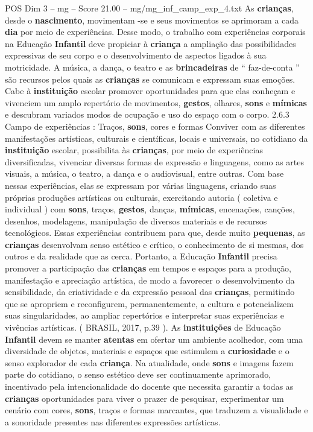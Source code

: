 \begin{textsample}{POS Dim 3 – mg – Score 21.00 – mg/mg\_inf\_camp\_exp\_4.txt}
As \textbf{crianças}, desde o \textbf{nascimento}, movimentam -se e seus movimentos se aprimoram a cada \textbf{dia} por meio de experiências.
Desse modo, o trabalho com experiências corporais na Educação \textbf{Infantil} deve propiciar à \textbf{criança} a ampliação das possibilidades expressivas de seu corpo e o desenvolvimento de aspectos ligados à sua motricidade.
A música, a dança, o teatro e as \textbf{brincadeiras} de “ faz-de-conta ” são recursos pelos quais as \textbf{crianças} se comunicam e expressam suas emoções.
Cabe à \textbf{instituição} escolar promover oportunidades para que elas conheçam e vivenciem um amplo repertório de movimentos, \textbf{gestos}, olhares, \textbf{sons} e \textbf{mímicas} e descubram variados modos de ocupação e uso do espaço com o corpo. 2.6.3 Campo de experiências : Traços, \textbf{sons}, cores e formas Conviver com as diferentes manifestações artísticas, culturais e científicas, locais e universais, no cotidiano da \textbf{instituição} escolar, possibilita às \textbf{crianças}, por meio de experiências diversificadas, vivenciar diversas formas de expressão e linguagens, como as artes visuais, a música, o teatro, a dança e o audiovisual, entre outras.
Com base nessas experiências, elas se expressam por várias linguagens, criando suas próprias produções artísticas ou culturais, exercitando autoria ( coletiva e individual ) com \textbf{sons}, traços, \textbf{gestos}, danças, \textbf{mímicas}, encenações, canções, desenhos, modelagens, manipulação de diversos materiais e de recursos tecnológicos.
Essas experiências contribuem para que, desde muito \textbf{pequenas}, as \textbf{crianças} desenvolvam senso estético e crítico, o conhecimento de si mesmas, dos outros e da realidade que as cerca.
Portanto, a Educação \textbf{Infantil} precisa promover a participação das \textbf{crianças} em tempos e espaços para a produção, manifestação e apreciação artística, de modo a favorecer o desenvolvimento da sensibilidade, da criatividade e da expressão pessoal das \textbf{crianças}, permitindo que se apropriem e reconfigurem, permanentemente, a cultura e potencializem suas singularidades, ao ampliar repertórios e interpretar suas experiências e vivências artísticas. ( BRASIL, 2017, p.39 ).
As \textbf{instituições} de Educação \textbf{Infantil} devem se manter \textbf{atentas} em ofertar um ambiente acolhedor, com uma diversidade de objetos, materiais e espaços que estimulem a \textbf{curiosidade} e o senso explorador de cada \textbf{criança}.
Na atualidade, onde \textbf{sons} e imagens fazem parte do cotidiano, o senso estético deve ser continuamente aprimorado, incentivado pela intencionalidade do docente que necessita garantir a todas as \textbf{crianças} oportunidades para viver o prazer de pesquisar, experimentar um cenário com cores, \textbf{sons}, traços e formas marcantes, que traduzem a visualidade e a sonoridade presentes nas diferentes expressões artísticas.

\end{textsample}
